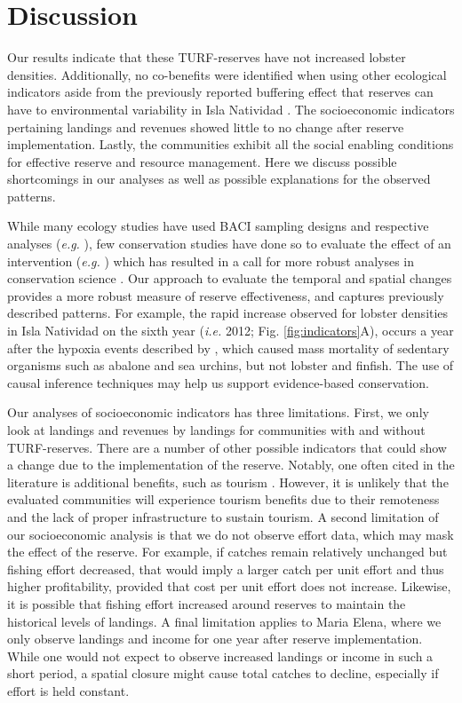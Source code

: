 \documentclass{frontiersSCNS}
\begin{document}
\hypertarget{discussion}{%
\section{Discussion}\label{discussion}}

Our results indicate that these TURF-reserves have not increased lobster densities. Additionally, no co-benefits were identified when using other ecological indicators aside from the previously reported buffering effect that reserves can have to environmental variability in Isla Natividad \citep{micheli_2012-EU}. The socioeconomic indicators pertaining landings and revenues showed little to no change after reserve implementation. Lastly, the communities exhibit all the social enabling conditions for effective reserve and resource management. Here we discuss possible shortcomings in our analyses as well as possible explanations for the observed patterns.

While many ecology studies have used BACI sampling designs and respective analyses (\emph{e.g.} \citet{stewartoaten_1986}), few conservation studies have done so to evaluate the effect of an intervention (\emph{e.g.} \citet{francinifilho_2008,lester_2009,moland_2013}) which has resulted in a call for more robust analyses in conservation science \citep{guidetti_2002,ferraro_2006}. Our approach to evaluate the temporal and spatial changes provides a more robust measure of reserve effectiveness, and captures previously described patterns. For example, the rapid increase observed for lobster densities in Isla Natividad on the sixth year (\emph{i.e.} 2012; Fig. \ref{fig:indicators}A), occurs a year after the hypoxia events described by \citet{micheli_2012-EU}, which caused mass mortality of sedentary organisms such as abalone and sea urchins, but not lobster and finfish. The use of causal inference techniques may help us support evidence-based conservation.

Our analyses of socioeconomic indicators has three limitations. First, we only look at landings and revenues by landings for communities with and without TURF-reserves. There are a number of other possible indicators that could show a change due to the implementation of the reserve. Notably, one often cited in the literature is additional benefits, such as tourism \citep{viana_2017}. However, it is unlikely that the evaluated communities will experience tourism benefits due to their remoteness and the lack of proper infrastructure to sustain tourism. A second limitation of our socioeconomic analysis is that we do not observe effort data, which may mask the effect of the reserve. For example, if catches remain relatively unchanged but fishing effort decreased, that would imply a larger catch per unit effort and thus higher profitability, provided that cost per unit effort does not increase. Likewise, it is possible that fishing effort increased around reserves to maintain the historical levels of landings. A final limitation applies to Maria Elena, where we only observe landings and income for one year after reserve implementation. While one would not expect to observe increased landings or income in such a short period, a spatial closure might cause total catches to decline, especially if effort is held constant.
\end{document}
